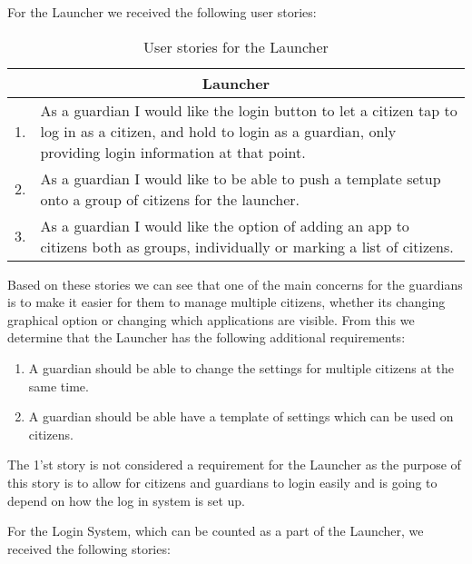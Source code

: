 For the Launcher we received the following user stories:

\begin{table}[H]
\begin{tabular}{|c|p{12.5cm}|}
\hline 
\multicolumn{2}{|c|}{Launcher}\\ \hline 
1. & As a guardian I would like the login button to let a citizen tap to log in
as a citizen, and hold to login as a guardian, only providing login information
at that point.\\\hline
2. & As a guardian I would like to be able to push a template setup onto a group
of citizens for the launcher.\\\hline
3. & As a guardian I would like the option of adding an app to citizens both as
groups, individually or marking a list of citizens.\\\hline
\end{tabular}
\caption{User stories for the Launcher}
\label{UserStoriesLauncher}
\end{table}

Based on these stories we can see that one of the main concerns for the
guardians is to make it easier for them to manage multiple citizens, whether its
changing graphical option or changing which applications are visible. From this
we determine that the Launcher has the following additional requirements:

\begin{enumerate}
  \item A guardian should be able to change the settings for multiple
  citizens at the same time.
  \item A guardian should be able have a template of settings which can be used
  on citizens.
\end{enumerate}
The 1'st story is not considered a requirement for the Launcher as the purpose
of this story is to allow for citizens and guardians to login easily and is
going to depend on how the log in system is set up.\nl

For the Login System, which can be counted as a part of the Launcher, we
received the following stories:

